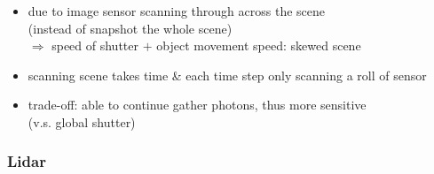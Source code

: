 \begin{itemize}
\begin{itemize}
		\begin{itemize}
		\item due to image sensor scanning through across the scene \\
		(instead of snapshot the whole scene) \\
		$\Rightarrow$ speed of shutter $+$ object movement speed: skewed scene
		\item scanning scene takes time \& each time step only scanning a roll of sensor
		\item trade-off: able to continue gather photons, thus more sensitive \\
		(v.s. global shutter)
		\end{itemize}
	\end{itemize}
\end{itemize}
\subsubsection{Lidar}

